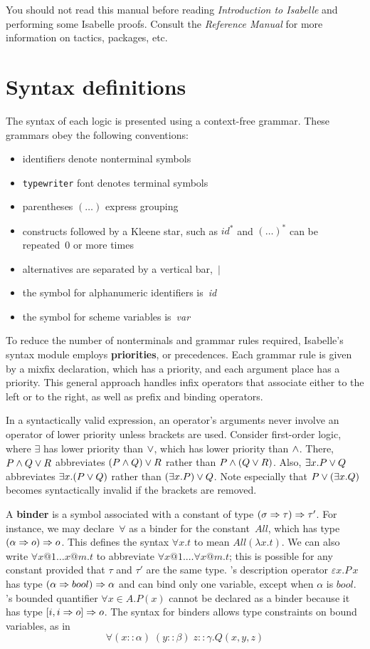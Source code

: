 You should not read this manual before reading {\em Introduction to
  Isabelle\/} and performing some Isabelle proofs.  Consult the {\em
  Reference Manual} for more information on tactics, packages, etc.


\section{Syntax definitions}
The syntax of each logic is presented using a context-free grammar.
These grammars obey the following conventions:
\begin{itemize}
\item identifiers denote nonterminal symbols
\item {\tt typewriter} font denotes terminal symbols
\item parentheses $(\ldots)$ express grouping
\item constructs followed by a Kleene star, such as $id^*$ and $(\ldots)^*$
can be repeated~0 or more times 
\item alternatives are separated by a vertical bar,~$|$
\item the symbol for alphanumeric identifiers is~{\it id\/} 
\item the symbol for scheme variables is~{\it var}
\end{itemize}
To reduce the number of nonterminals and grammar rules required, Isabelle's
syntax module employs {\bf priorities}, or precedences.
Each grammar rule is given by a mixfix declaration, which has a priority,
and each argument place has a priority.  This general approach handles
infix operators that associate either to the left or to the right, as well
as prefix and binding operators.

In a syntactically valid expression, an operator's arguments never involve
an operator of lower priority unless brackets are used.  Consider
first-order logic, where $\exists$ has lower priority than $\vee$,
which has lower priority than $\wedge$.  There, $P\wedge Q \vee R$
abbreviates $(P\wedge Q) \vee R$ rather than $P\wedge (Q\vee R)$.  Also,
$\exists x.P\vee Q$ abbreviates $\exists x.(P\vee Q)$ rather than
$(\exists x.P)\vee Q$.  Note especially that $P\vee(\exists x.Q)$
becomes syntactically invalid if the brackets are removed.

A {\bf binder} is a symbol associated with a constant of type
$(\sigma\Rightarrow\tau)\Rightarrow\tau'$.  For instance, we may declare~$\forall$ as
a binder for the constant~$All$, which has type $(\alpha\Rightarrow o)\Rightarrow o$.
This defines the syntax $\forall x.t$ to mean $All(\lambda x.t)$.  We
can also write $\forall x@1\ldots x@m.t$ to abbreviate $\forall x@1.
\ldots \forall x@m.t$; this is possible for any constant provided that
$\tau$ and $\tau'$ are the same type.  \HOL's description operator
$\varepsilon x.P\,x$ has type $(\alpha\Rightarrow bool)\Rightarrow\alpha$ and can bind
only one variable, except when $\alpha$ is $bool$.  \ZF's bounded
quantifier $\forall x\in A.P(x)$ cannot be declared as a binder
because it has type $[i, i\Rightarrow o]\Rightarrow o$.  The syntax for binders allows
type constraints on bound variables, as in
\[ \forall (x{::}\alpha) \; (y{::}\beta) \; z{::}\gamma. Q(x,y,z) \]

